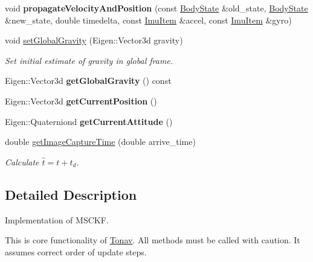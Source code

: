 \begin{DoxyCompactItemize}
\item 
\hypertarget{class_filter_ae98ff24d5d95e65584fa6413f64bb9aa}{void {\bfseries propagate\-Velocity\-And\-Position} (const \hyperlink{class_body_state}{Body\-State} \&old\-\_\-state, \hyperlink{class_body_state}{Body\-State} \&new\-\_\-state, double timedelta, const \hyperlink{class_imu_item}{Imu\-Item} \&accel, const \hyperlink{class_imu_item}{Imu\-Item} \&gyro)}\label{class_filter_ae98ff24d5d95e65584fa6413f64bb9aa}

\item 
void \hyperlink{class_filter_ad046b83209a1f03d65ac75f16b538546}{set\-Global\-Gravity} (Eigen\-::\-Vector3d gravity)
\begin{DoxyCompactList}\small\item\em Set initial estimate of gravity in global frame. \end{DoxyCompactList}\item 
\hypertarget{class_filter_aeeb0c2e971a47c73c2f950aa8890f1ac}{Eigen\-::\-Vector3d {\bfseries get\-Global\-Gravity} () const }\label{class_filter_aeeb0c2e971a47c73c2f950aa8890f1ac}

\item 
\hypertarget{class_filter_a936ea0f9f4f587d0cd9bc26a4a73df34}{Eigen\-::\-Vector3d {\bfseries get\-Current\-Position} ()}\label{class_filter_a936ea0f9f4f587d0cd9bc26a4a73df34}

\item 
\hypertarget{class_filter_a7094e57e502a4fc7f124f0d1184eb133}{Eigen\-::\-Quaterniond {\bfseries get\-Current\-Attitude} ()}\label{class_filter_a7094e57e502a4fc7f124f0d1184eb133}

\item 
double \hyperlink{class_filter_a1c7a33a737fafec46d6e98ec1be37a4c}{get\-Image\-Capture\-Time} (double arrive\-\_\-time)
\begin{DoxyCompactList}\small\item\em Calculate $\hat{t} = t + \hat{t}_d$. \end{DoxyCompactList}\end{DoxyCompactItemize}


\subsection{Detailed Description}
Implementation of M\-S\-C\-K\-F. 

This is core functionality of \hyperlink{class_tonav}{Tonav}. All methods must be called with caution. It assumes correct order of update steps.

